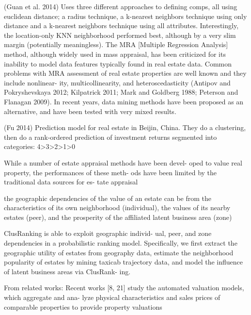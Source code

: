 \documentclass[]{article}
\begin{document}
(Guan et al. 2014) Uses three different approaches to defining comps,
all using euclidean distance; a radius technique, a k-nearest neighbors
technique using only distance and a k-nearest neighbors technique using
all attributes. Interestingly, the location-only KNN neighborhood
performed best, although by a very slim margin (potentially
meaningless). The MRA {[}Multiple Regression Analysis{]} method,
although widely used in mass appraisal, has been criticized for its
inability to model data features typically found in real estate data.
Common problems with MRA assessment of real estate properties are well
known and they include nonlinear- ity, multicollinearity, and
heteroscedasticity (Antipov and Pokryshevskaya 2012; Kilpatrick 2011;
Mark and Goldberg 1988; Peterson and Flanagan 2009). In recent years,
data mining methods have been proposed as an alternative, and have been
tested with very mixed results.

(Fu 2014) Prediction model for real estate in Beijin, China. They do a
clustering, then do a rank-ordered prediction of investment returns
segmented into categories:
4\textgreater{}3\textgreater{}2\textgreater{}1\textgreater{}0

While a number of estate appraisal methods have been devel- oped to
value real property, the performances of these meth- ods have been
limited by the traditional data sources for es- tate appraisal

the geographic dependencies of the value of an estate can be from the
characteristics of its own neighborhood (individual), the values of its
nearby estates (peer), and the prosperity of the affiliated latent
business area (zone)

ClusRanking is able to exploit geographic individ- ual, peer, and zone
dependencies in a probabilistic ranking model. Specifically, we first
extract the geographic utility of estates from geography data, estimate
the neighborhood popularity of estates by mining taxicab trajectory
data, and model the influence of latent business areas via ClusRank-
ing.

From related works: Recent works {[}8, 21{]} study the automated
valuation models, which aggregate and ana- lyze physical characteristics
and sales prices of comparable properties to provide property valuations
\end{document}
